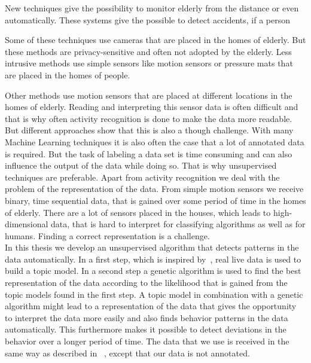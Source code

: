 \documentclass[a4paper,fleqn]{article}
\begin{document}
New techniques give the possibility to monitor elderly from the distance or even automatically. These systems give the possible to detect accidents, if a person 

Some of these techniques use cameras that are placed in the homes of elderly. But these methods are privacy-sensitive and often not adopted by the elderly. Less intrusive methods use simple sensors like motion sensors or pressure mats that are placed in the homes of people.

Other methods use motion sensors that are placed at different locations in the homes of elderly. %
Reading and interpreting this sensor data is often difficult and that is why often activity recognition is done to make the data more readable. But different approaches show that this is also a though challenge.
With many Machine Learning techniques it is also often the case that a lot of annotated data is required.  But the task of labeling a data set is time consuming and can also influence the output of the data while doing so. That is why unsupervised techniques are preferable. Apart from activity recognition we deal with the problem of the representation of the data. From simple motion sensors we receive binary, time sequential data, that is gained over some period of time in the homes of elderly. There are a lot of sensors placed in the houses, which leads to high-dimensional data, that is hard to interpret for classifying algorithms as well as for humans. Finding a correct representation is a challenge.\\

In this thesis we develop an unsupervised algorithm that detects patterns in the data automatically.
In a first step, which is inspired by~\cite{farrahi2008daily}, real live data is used to build a topic model. In a second step a genetic algorithm is used to find the best representation of the data according to the likelihood that is gained from the topic models found in the first step. 
 A topic model in combination with a genetic algorithm might lead to a representation of the data that gives the opportunity to interpret the data more easily and also finds behavior patterns in the data automatically. This furthermore makes it possible to detect deviations in the behavior over a longer period of time. The data that we use is received in the same way as described in ~\cite{van2010activity}, except that our data is not annotated.\\
\end{document}
